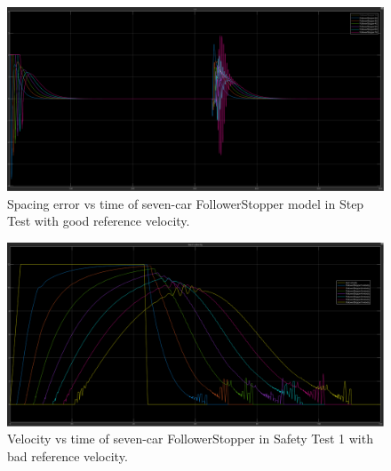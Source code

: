 \documentclass[conference]{IEEEtran}
\begin{document}
\begin{appendix}
\begin{figure}[htbp]
\centerline{\includegraphics[width=6.50 in]{multiFS_errorgood.png}}
\caption{Spacing error vs time of seven-car FollowerStopper model in Step Test with good reference velocity.}
\label{stringerrorgood}
\end{figure}

\begin{figure}[htbp]
\centerline{\includegraphics[width=6.50 in]{multiFS_safety1.png}}
\caption{Velocity vs time of seven-car FollowerStopper in Safety Test 1 with bad reference velocity.}
\label{stringsafety1}
\end{figure}

\end{appendix}
\end{document}
